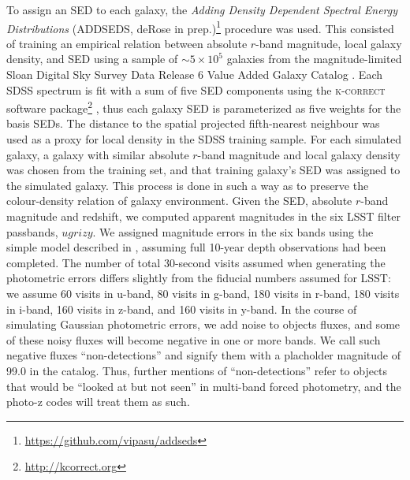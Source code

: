 To assign an SED to each galaxy, the {\it Adding Density Dependent Spectral Energy Distributions} (\textsc{ADDSEDS}, deRose in prep.)\footnote{\url{https://github.com/vipasu/addseds}} procedure was used. This consisted of training an empirical relation between absolute $r$-band magnitude, local galaxy density, and SED using a sample of $\sim 5\times 10^{5}$ galaxies from the magnitude-limited Sloan Digital Sky Survey Data Release 6 Value Added Galaxy Catalog \citep{Blanton:05}.  Each SDSS spectrum is fit with a sum of five SED components using the \textsc{k-correct } software package\footnote{\url{http://kcorrect.org}} \citep{Blanton:07}, thus each galaxy SED is parameterized as five weights for the basis SEDs. The distance to the spatial projected fifth-nearest neighbour was used as a proxy for local density in the SDSS training sample. For each simulated galaxy, a galaxy with similar absolute $r$-band magnitude and local galaxy density was chosen from the training set, and that training galaxy's SED was assigned to the simulated galaxy.  This process is done in such a way as to preserve the colour-density relation of galaxy environment.  Given the SED, absolute $r$-band magnitude and redshift, we computed apparent magnitudes in the six LSST filter passbands, $ugrizy$. We assigned magnitude errors in the six bands using the simple model described in \citet{Ivezic:08}, assuming full 10-year depth observations had been completed.  The number of total 30-second visits assumed when generating the photometric errors differs slightly from the fiducial numbers assumed for LSST: we assume 60 visits in u-band, 80 visits in g-band, 180 visits in r-band, 180 visits in i-band, 160 visits in z-band, and 160 visits in y-band.
In the course of simulating Gaussian photometric errors, we add noise to objects fluxes, and some of these noisy fluxes will become negative in one or more bands.  We call such negative fluxes ``non-detections'' and signify them with a placholder magnitude of 99.0 in the catalog.  Thus, further mentions of ``non-detections'' refer to objects that would be ``looked at but not seen'' in multi-band forced photometry, and the photo-z codes will treat them as such.

